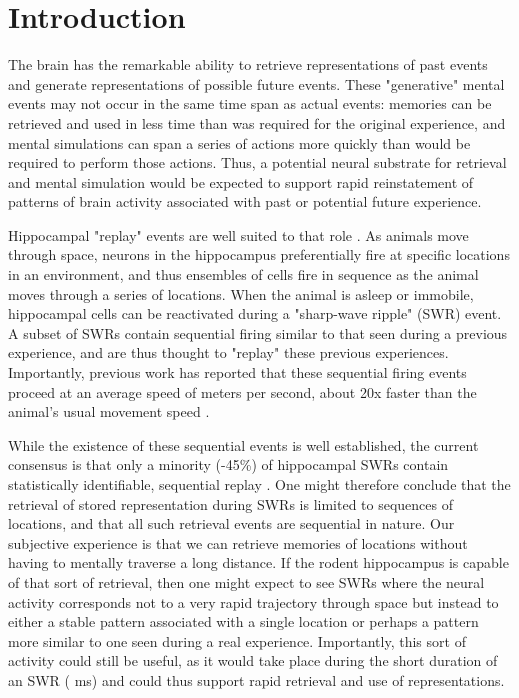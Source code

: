 \documentclass[9pt,lineno]{elife}
\begin{document}
\section*{Introduction}

The brain has the remarkable ability to retrieve representations of past events and generate representations of possible future events. These "generative" \citep{KayConstantSubsecondCycling2020} mental events may not occur in the same time span as actual events: memories can be retrieved and used in less time than was required for the original experience, and mental simulations can span a series of actions more quickly than would be required to perform those actions. Thus, a potential neural substrate for retrieval and mental simulation would be expected to support rapid reinstatement of patterns of brain activity associated with past or potential future experience.

Hippocampal "replay" events are well suited to that role \citep{CarrHippocampalreplayawake2011}. As animals move through space, neurons in the hippocampus preferentially fire at specific locations in an environment, and thus ensembles of cells fire in sequence as the animal moves through a series of locations. When the animal is asleep or immobile, hippocampal cells can be reactivated during a "sharp-wave ripple" (SWR) event. A subset of SWRs contain sequential firing similar to that seen during a previous experience, and are thus thought to "replay" these previous experiences. Importantly, previous work has reported that these sequential firing events proceed at an average speed of  meters per second, about 20x faster than the animal's usual movement speed \citep{NadasdyReplayTimeCompression1999, LeeMemorySequentialExperience2002, DavidsonHippocampalReplayExtended2009, KarlssonAwakereplayremote2009}. 

While the existence of these sequential events is well established, the current consensus is that only a minority (-45\%) of hippocampal SWRs contain statistically identifiable, sequential replay \citep{MichonPostlearningHippocampalReplay2019, KaeferReplayBehavioralSequences2020, ShinDynamicsAwakeHippocampalPrefrontal2019, DavidsonHippocampalReplayExtended2009, Tingleymethodsreactivationreplay2020}. One might therefore conclude that the retrieval of stored representation during SWRs is limited to sequences of locations, and that all such retrieval events are sequential in nature. Our subjective experience is that we can retrieve memories of locations without having to mentally traverse a long distance. If the rodent hippocampus is capable of that sort of retrieval, then one might expect to see SWRs where the neural activity corresponds not to a very rapid trajectory through space but instead to either a stable pattern associated with a single location or perhaps a pattern more similar to one seen during a real experience. Importantly, this sort of activity could still be useful, as it would take place during the short duration of an SWR ( ms) and could thus support rapid retrieval and use of representations.
\end{document}
